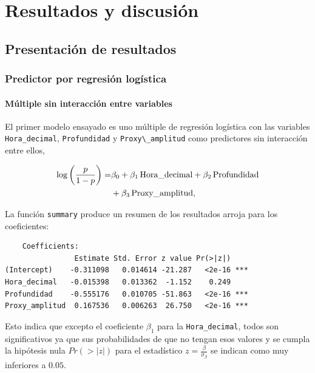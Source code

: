\documentclass[a4paper]{report}
\begin{document}
\chapter{Resultados y discusión}


\section{Presentación de resultados}


\subsection{Predictor por regresión logística}


\subsubsection*{Múltiple sin interacción entre variables}

El primer modelo ensayado es uno múltiple de regresión logística con las variables \verb'Hora_decimal', \verb'Profundidad' y \verb'Proxy\_amplitud' como predictores sin interacción entre ellos,

\begin{align}
	\log \left( \frac{p}{1-p} \right) = &
	 \beta_0 + \beta_1\, \text{Hora\_decimal} + \beta_2 \, \text{Profundidad}\notag\\
	& + \beta_3 \, \text{Proxy\_amplitud},
	\label{eq:regresion_logistica}
\end{align}

La función \verb'summary' produce un resumen de los resultados arroja para los coeficientes:
\begin{verbatim}
	Coefficients:
                Estimate Std. Error z value Pr(>|z|)    
(Intercept)    -0.311098   0.014614 -21.287   <2e-16 ***
Hora_decimal   -0.015398   0.013362  -1.152    0.249    
Profundidad    -0.555176   0.010705 -51.863   <2e-16 ***
Proxy_amplitud  0.167536   0.006263  26.750   <2e-16 ***
\end{verbatim} 
Esto indica que excepto el coeficiente \(\beta_1\) para la \verb'Hora_decimal', todos son significativos ya que sus probabilidades de que no tengan esos valores y se cumpla la hipótesis nula \(Pr(>|z|)\) para el estadístico \(z = \frac{\beta}{\sigma_\beta}\) se indican como muy inferiores a \(0.05\).
\end{document}
